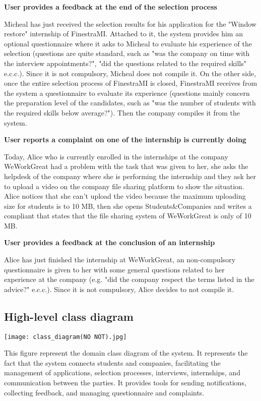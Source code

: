 			\textbf{User provides a feedback at the end of the selection process}
			\begin{flushleft}
				Micheal has just received the selection results for his application for the "Window restore" internship of FinestraMI. Attached to it, the system provides him an optional questionnaire where it asks to Micheal to evaluate his experience of the selection (questions are quite standard, such as "was the company on time with the interview appointments?", "did the questions related to the required skills" e.c.c.). Since it is not compulsory, Micheal does not compile it. On the other side, once the entire selection process of FinestraMI is closed, FinestraMI receives from the system a questionnaire to evaluate its experience (questions mainly concern the preparation level of the candidates, such as "was the number of students with the required skills below average?"). Then the company compiles it from the system.
			\end{flushleft}
			\textbf{User reports a complaint on one of the internship is currently doing}
			\begin{flushleft}
				Today, Alice who is currently enrolled in the internships at the company WeWorkGreat had a problem with the task that was given to her, she asks the helpdesk of the company where she is performing the internship and they ask her to upload a video on the company file sharing platform to show the situation. Alice notices that she can’t upload the video because the maximum uploading size for students is to 10 MB, then she opens Students\&Companies and writes a compliant that states that the file sharing system of WeWorkGreat is only of 10 MB.
			\end{flushleft}
			\textbf{User provides a feedback at the conclusion of an internship}
			\begin{flushleft}
				Alice has just finished the internship at WeWorkGreat, an non-compulsory questionnaire is given to her with some general questions related to her experience at the company (e.g. "did the company respect the terms listed in the advice?" e.c.c.). Since it is not compulsory, Alice decides to not compile it.
			\end{flushleft}
		\subsection{High-level class diagram}
			\texttt{[image: class\_diagram(NO NOT).jpg]}
			
			This figure represent the domain class diagram of the system. It represents the fact that the system connects students and companies, facilitating the management of applications, selection processes, interviews, internships, and communication between the parties. It provides tools for sending notifications, collecting feedback, and managing questionnaire and complaints.
			

